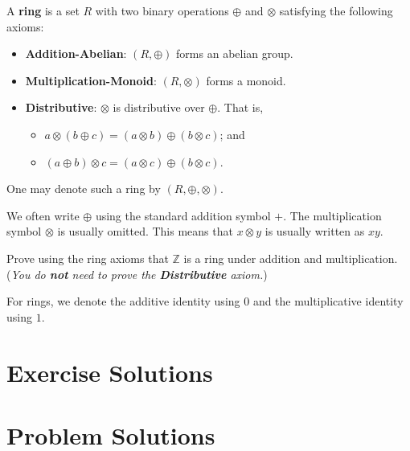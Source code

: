 \begin{definition}
    A \textbf{ring} is a set $R$ with two binary operations $\oplus$ and $\otimes$ satisfying the following axioms:
    \begin{itemize}
        \item \textbf{Addition-Abelian}: $(R, \oplus)$ forms an abelian group.
        \item \textbf{Multiplication-Monoid}: $(R, \otimes)$ forms a monoid.
        \item \textbf{Distributive}: $\otimes$ is distributive over $\oplus$. That is,
        \begin{itemize}
            \item $a \otimes (b \oplus c) = (a \otimes b) \oplus (b \otimes c)$; and
            \item $(a \oplus b) \otimes c = (a \otimes c) \oplus (b \otimes c)$.
        \end{itemize}
    \end{itemize}
    One may denote such a ring by $(R, \oplus, \otimes)$.
\end{definition}
\begin{remark}
    We often write $\oplus$ using the standard addition symbol $+$. The multiplication symbol $\otimes$ is usually omitted. This means that $x \otimes y$ is usually written as $xy$.
\end{remark}


\begin{exercise}
    Prove using the ring axioms that $\mathbb{Z}$ is a ring under addition and multiplication.\newline
    (\textit{You do \textbf{not} need to prove the \textbf{Distributive} axiom.})
\end{exercise}

For rings, we denote the additive identity using $0$ and the multiplicative identity using $1$.

\appendix
\chapter{Exercise Solutions}

\chapter{Problem Solutions}

